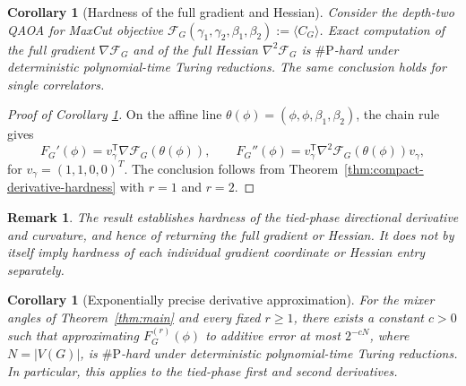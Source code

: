 \documentclass[11pt]{article}
\newtheorem{corollary}[theorem]{Corollary}
\newtheorem{remark}[theorem]{Remark}
\begin{document}
\begin{corollary}[Hardness of the full gradient and Hessian]
\label{cor:compact-gradient-hessian}
Consider the depth-two QAOA for MaxCut objective
 $ \mathcal F_G(\gamma_1,\gamma_2,\beta_1,\beta_2)
  :=\langle C_G\rangle$. 
 Exact computation of the full gradient
$\nabla\mathcal F_G$ and of the full Hessian $\nabla^2\mathcal F_G$ is
$\#\mathrm{P}$-hard under deterministic polynomial-time Turing reductions.
The same conclusion holds for single correlators.
\end{corollary}

\begin{proof}[Proof of Corollary \ref{cor:compact-gradient-hessian}]
On the affine line
$\theta(\phi)=(\phi,\phi,\beta_1,\beta_2)$, the chain rule gives
\[
  F_G'(\phi)
  =
  v_\gamma^{\mathsf T}\nabla\mathcal F_G(\theta(\phi)),
  \qquad
  F_G''(\phi)
  =
  v_\gamma^{\mathsf T}\nabla^2\mathcal F_G(\theta(\phi))v_\gamma,
\]
for $v_\gamma=(1,1,0,0)^T$. 
The conclusion follows from
Theorem~\ref{thm:compact-derivative-hardness} with $r=1$ and $r=2$.
\end{proof}

\begin{remark}
The result establishes hardness of the tied-phase directional derivative
and curvature, and hence of returning the full gradient or Hessian.  It
does not by itself imply hardness of each individual gradient coordinate
or Hessian entry separately.
\end{remark}

\begin{corollary}[Exponentially precise derivative approximation]
\label{cor:approximate-derivative-hardness}
For %
the mixer angles of Theorem~\ref{thm:main} and every fixed $r\ge1$,
there exists a constant $c>0$ such that approximating
$F_G^{(r)}(\phi)$ to additive error at most $2^{-cN}$, where
$N=|V(G)|$, is $\#\mathrm{P}$-hard under deterministic polynomial-time
Turing reductions.  In particular, this applies to the tied-phase first
and second derivatives.
\end{corollary}
\end{document}
